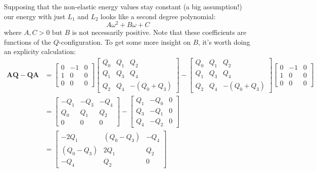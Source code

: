 \documentclass[reqno]{article}
\newcommand{\Q}{\mathbf{Q}}
\newcommand{\A}{\mathbf{A}}
\begin{document}
Supposing that the non-elastic energy values stay constant (a big assumption!) our energy with just $L_1$ and $L_2$ looks like a second degree polynomial:
\begin{equation}
    A \omega^2 + B \omega + C
\end{equation}
where $A, C > 0$ but $B$ is not necessarily positive.
Note that these coefficients are functions of the $Q$-configuration.
To get some more insight on $B$, it's worth doing an explicity calculation:
\begin{equation}
\begin{split}
    \A \Q - \Q \A
    &=
    \begin{bmatrix}
        0 &-1 &0 \\
        1 &0 &0 \\
        0 &0 &0
    \end{bmatrix}
    \begin{bmatrix}
        Q_0 &Q_1 &Q_2 \\
        Q_1 &Q_3 &Q_4 \\
        Q_2 &Q_4 &-(Q_0 + Q_3)
    \end{bmatrix}
    -
    \begin{bmatrix}
        Q_0 &Q_1 &Q_2 \\
        Q_1 &Q_3 &Q_4 \\
        Q_2 &Q_4 &-(Q_0 + Q_3)
    \end{bmatrix}
    \begin{bmatrix}
        0 &-1 &0 \\
        1 &0 &0 \\
        0 &0 &0
    \end{bmatrix} \\
    &=
    \begin{bmatrix}
        -Q_1 &-Q_3 &-Q_4 \\
        Q_0 &Q_1 &Q_2 \\
        0 &0 &0
    \end{bmatrix}
    -
    \begin{bmatrix}
        Q_1 &-Q_0 &0 \\
        Q_3 &-Q_1 &0 \\
        Q_4 &-Q_2 &0
    \end{bmatrix} \\
    &=
    \begin{bmatrix}
        -2 Q_1 &(Q_0 - Q_3) &-Q_4 \\
        (Q_0 - Q_3) &2 Q_1 &Q_2 \\
        -Q_4 &Q_2 &0
    \end{bmatrix}
\end{split}
\end{equation}
\end{document}
